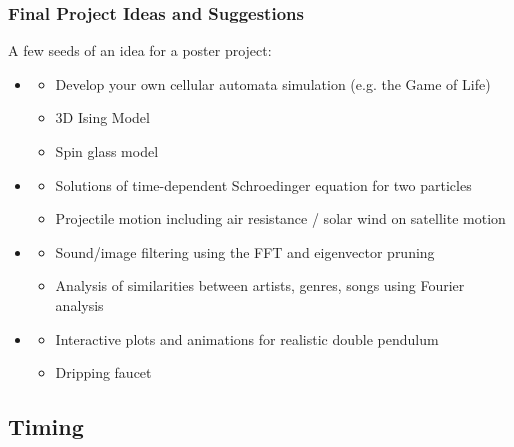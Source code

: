 \documentclass[hyperref={colorlinks=true}]{beamer}
\begin{document}
\begin{frame}%
  \frametitle{Final Project Ideas and Suggestions}

  A few seeds of an idea for a poster project:

    \begin{itemize}
      \item {}
      \begin{itemize}
        \item Develop your own cellular automata simulation (e.g. the Game of Life)
        \item 3D Ising Model
        \item Spin glass model
      \end{itemize}
      \item {}
      \begin{itemize}
        \item Solutions of time-dependent Schroedinger equation for two particles
        \item Projectile motion including air resistance / solar wind on satellite motion
      \end{itemize}
      \item {}
      \begin{itemize}
        \item Sound/image filtering using the FFT and eigenvector pruning
        \item Analysis of similarities between artists, genres, songs using Fourier analysis
      \end{itemize}
      \item {}
      \begin{itemize}
        \item Interactive plots and animations for realistic double pendulum
        \item Dripping faucet
      \end{itemize}
    \end{itemize}

  
\end{frame}

\subsection[Timing]{Timing}
\end{document}
